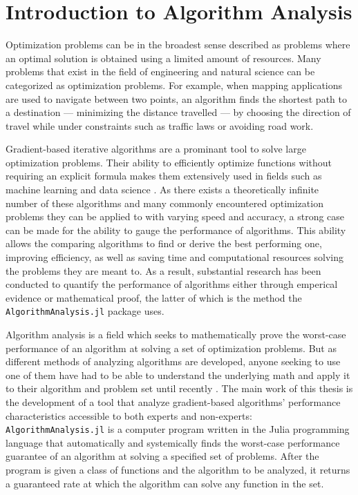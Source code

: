 \chapter{Introduction to Algorithm Analysis}

Optimization problems can be in the broadest sense described as problems where an optimal solution is obtained using a limited amount of resources. Many problems that exist in the field of engineering and natural science can be categorized as optimization problems. For example, when mapping applications are used to navigate between two points, an algorithm finds the shortest path to a destination --- minimizing the distance travelled --- by choosing the direction of travel while under constraints such as traffic laws or avoiding road work.

Gradient-based iterative algorithms are a prominant tool to solve large optimization problems. Their ability to efficiently optimize functions without requiring an explicit formula makes them extensively used in fields such as machine learning and data science \cite{Wright_Recht_2022}. As there exists a theoretically infinite number of these algorithms and many commonly encountered optimization problems they can be applied to with varying speed and accuracy, a strong case can be made for the ability to gauge the performance of algorithms. This ability allows the comparing algorithms to find or derive the best performing one, improving efficiency, as well as saving time and computational resources solving the problems they are meant to. As a result, substantial research has been conducted to quantify the performance of algorithms either through emperical evidence or mathematical proof, the latter of which is the method the \texttt{AlgorithmAnalysis.jl} package uses.

Algorithm analysis is a field which seeks to mathematically prove the worst-case performance of an algorithm at solving a set of optimization problems. But as different methods of analyzing algorithms are developed, anyone seeking to use one of them have had to be able to understand the underlying math and apply it to their algorithm and problem set until recently \cite{pepit}. The main work of this thesis is the development of a tool that analyze gradient-based algorithms' performance characteristics accessible to both experts and non-experts: \texttt{AlgorithmAnalysis.jl} is a computer program written in the Julia programming language that automatically and systemically finds the worst-case performance guarantee of an algorithm at solving a specified set of problems. After the program is given a class of functions and the algorithm to be analyzed, it returns a guaranteed rate at which the algorithm can solve any function in the set.

